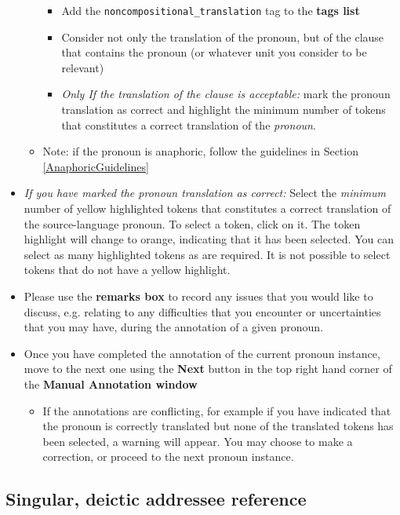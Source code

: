 \documentclass[11pt]{article} %
\newcommand\tag[1]{\texttt{#1}}
\begin{document}
\begin{itemize}
\begin{itemize}
    	\begin{itemize}
		\item Add the \tag{noncompositional\_translation} tag to the \textbf{tags list}
		\item Consider not only the translation of the pronoun, but of the clause that contains the pronoun (or whatever unit you consider to be relevant)
		\item \textit{Only If the translation of the clause is acceptable:} mark the pronoun translation as correct and highlight the minimum number of tokens that constitutes a correct translation of the \textit{pronoun}.
	\end{itemize}
    \item Note: if the pronoun is anaphoric, follow the guidelines in Section \ref{AnaphoricGuidelines}
  \end{itemize}
  \item \textit{If you have marked the pronoun translation as correct:} Select the \textit{minimum} number of yellow highlighted tokens that constitutes a correct translation of the source-language pronoun. To select a token, click on it. The token highlight will change to orange, indicating that it has been selected. You can select as many highlighted tokens as are required. It is not possible to select tokens that do not have a yellow highlight.
  \item Please use the \textbf{remarks box} to record any issues that you would like to discuss, e.g. relating to any difficulties that you encounter or uncertainties that you may have, during the annotation of a given pronoun.
  \item Once you have completed the annotation of the current pronoun instance, move to the next one using the \textbf{Next} button in the top right hand corner of the \textbf{Manual Annotation window}
  \begin{itemize}
    \item If the annotations are conflicting, for example if you have indicated that the pronoun is correctly translated but none of the translated tokens has been selected, a warning will appear. You may choose to make a correction, or proceed to the next pronoun instance.
  \end{itemize}
\end{itemize}

\subsection{Singular, deictic addressee reference}
\end{document}
